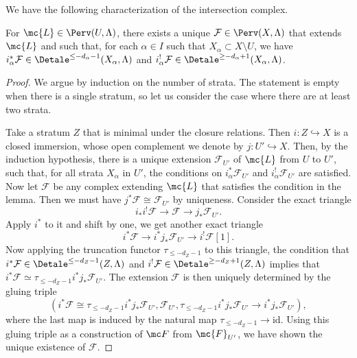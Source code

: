 \documentclass[letterpaper,11pt]{amsart}
\begin{document}
We have the following characterization of the intersection complex. 
\begin{lemma}\label{lemma: uniqueIC}
    For $\mc{L} \in \Perv(U,\Lambda)$, there exists a unique $\mathcal{F}\in \Perv(X,\Lambda)$ that extends $\mc{L}$ and such that, for each $\alpha \in I$ such that $X_{\alpha}\subset X\setminus U$, we have $i_{\alpha}^\ast\mathcal{F}\in \Detale^{\leq -d_{\alpha}-1}(X_{\alpha}, \Lambda)$ and $i_{\alpha}^!\mathcal{F}\in \Detale^{\geq -d_{\alpha}+1}(X_\alpha, \Lambda)$.
\end{lemma}
\begin{proof}
    We argue by induction on the number of strata. The statement is empty when there is a single stratum, so let us consider the case where there are at least two strata. 
    
    Take a stratum $Z$ that is minimal under the closure relations. Then $i: Z\hookrightarrow X$ is a closed immersion, whose open complement we denote by $j: U'\hookrightarrow X$. Then, by the induction hypothesis, there is a unique extension $\mathcal{F}_{U'}$ of $\mc{L}$ from $U$ to $U'$, such that, for all strata $X_\alpha$ in $U'$, the conditions on $i_{\alpha}^\ast \mathcal{F}_{U'}$ and $i_{\alpha}^! \mathcal{F}_{U'}$ are satisfied. Now let $\mathcal{F}$ be any complex extending $\mc{L}$ that satisfies the condition in the lemma. %
    Then we must have $j^\ast \mathcal{F}\cong \mathcal{F}_{U'}$ by uniqueness. Consider the exact triangle
    \[i_\ast i^!\mathcal{F}\to \mathcal{F}\to j_\ast \mathcal{F}_{U'}.\]
    Apply $i^\ast$ to it and shift by one, we get another exact triangle
    \[ i^\ast \mathcal{F}\to i^\ast j_\ast \mathcal{F}_{U'}\to i^! \mathcal{F}[1].\]
    Now applying the truncation functor $\tau_{\leq -d_Z-1}$ to this triangle, the condition that $i^\ast \mathcal{F}\in \Detale^{\leq -d_Z-1}(Z,\Lambda)$ and $i^! \mathcal{F}\in \Detale^{\geq -d_Z+1}(Z,\Lambda)$ implies that $i^\ast \mathcal{F}\simeq \tau_{\leq -d_Z-1}i^\ast j_\ast\mathcal{F}_{U'}$. The extension $\mathcal{F}$ is then uniquely determined by the gluing triple 
    \[(i^\ast \mathcal{F}\cong \tau_{\leq -d_Z-1}i^\ast j_\ast\mathcal{F}_{U'}, \mathcal{F}_{U'}, \tau_{\leq -d_Z-1}i^\ast j_\ast\mathcal{F}_{U'}\to i^\ast j_\ast\mathcal{F}_{U'}),\]
    where the last map is induced by the natural map $\tau_{\leq -d_Z-1}\to \mathrm{id}$. Using this gluing triple as a construction of $\mc F$ from $\mc{F}_{U'}$, we have shown the unique existence of $\mathcal{F}$. 
\end{proof}
\end{document}
